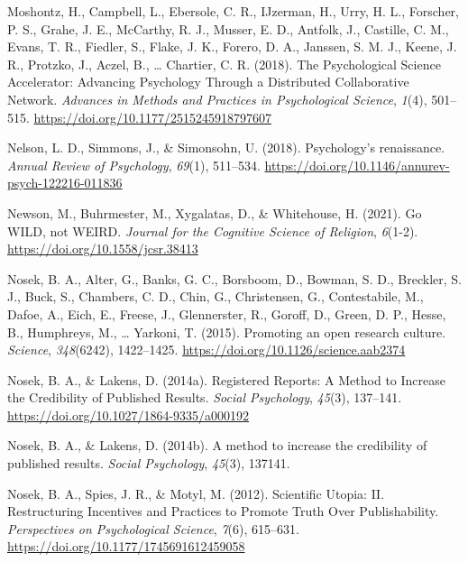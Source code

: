 \documentclass[
  man]{apa7}
\newlength{\cslhangindent}
\newlength{\cslentryspacingunit} %
\newenvironment{CSLReferences}[2] %
 {%
  \setlength{\parindent}{0pt}
  \ifodd #1
  \let\oldpar\par
  \def\par{\hangindent=\cslhangindent\oldpar}
  \fi
  \setlength{\parskip}{#2\cslentryspacingunit}
 }%
 {}
\begin{document}
\begin{CSLReferences}{1}{0}
\leavevmode{}%
Moshontz, H., Campbell, L., Ebersole, C. R., IJzerman, H., Urry, H. L., Forscher, P. S., Grahe, J. E., McCarthy, R. J., Musser, E. D., Antfolk, J., Castille, C. M., Evans, T. R., Fiedler, S., Flake, J. K., Forero, D. A., Janssen, S. M. J., Keene, J. R., Protzko, J., Aczel, B., \ldots{} Chartier, C. R. (2018). The Psychological Science Accelerator: Advancing Psychology Through a Distributed Collaborative Network. \emph{Advances in Methods and Practices in Psychological Science}, \emph{1}(4), 501--515. \url{https://doi.org/10.1177/2515245918797607}

\leavevmode{}%
Nelson, L. D., Simmons, J., \& Simonsohn, U. (2018). Psychology's renaissance. \emph{Annual Review of Psychology}, \emph{69}(1), 511--534. \url{https://doi.org/10.1146/annurev-psych-122216-011836}

\leavevmode{}%
Newson, M., Buhrmester, M., Xygalatas, D., \& Whitehouse, H. (2021). Go WILD, not WEIRD. \emph{Journal for the Cognitive Science of Religion}, \emph{6}(1-2). \url{https://doi.org/10.1558/jcsr.38413}

\leavevmode{}%
Nosek, B. A., Alter, G., Banks, G. C., Borsboom, D., Bowman, S. D., Breckler, S. J., Buck, S., Chambers, C. D., Chin, G., Christensen, G., Contestabile, M., Dafoe, A., Eich, E., Freese, J., Glennerster, R., Goroff, D., Green, D. P., Hesse, B., Humphreys, M., \ldots{} Yarkoni, T. (2015). Promoting an open research culture. \emph{Science}, \emph{348}(6242), 1422--1425. \url{https://doi.org/10.1126/science.aab2374}

\leavevmode{}%
Nosek, B. A., \& Lakens, D. (2014a). Registered Reports: A Method to Increase the Credibility of Published Results. \emph{Social Psychology}, \emph{45}(3), 137--141. \url{https://doi.org/10.1027/1864-9335/a000192}

\leavevmode{}%
Nosek, B. A., \& Lakens, D. (2014b). A method to increase the credibility of published results. \emph{Social Psychology}, \emph{45}(3), 137141.

\leavevmode{}%
Nosek, B. A., Spies, J. R., \& Motyl, M. (2012). Scientific Utopia: II. Restructuring Incentives and Practices to Promote Truth Over Publishability. \emph{Perspectives on Psychological Science}, \emph{7}(6), 615--631. \url{https://doi.org/10.1177/1745691612459058}


\end{CSLReferences}
\end{document}
